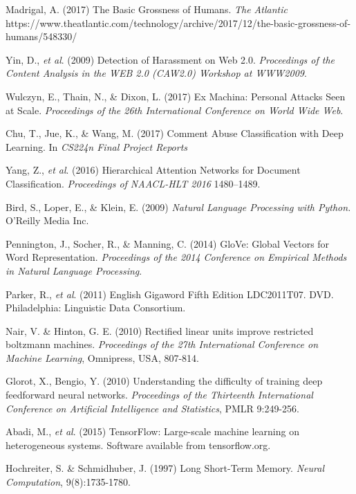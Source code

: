 \documentclass{article} %
\begin{document}
\footnotesize{
\begin{thebibliography}{9}

 Madrigal, A. (2017) The Basic Grossness of Humans. \textit{The Atlantic} https://www.theatlantic.com/technology/archive/2017/12/the-basic-grossness-of-humans/548330/

Yin, D., \textit{et al}. (2009) Detection of Harassment on Web 2.0. \textit{Proceedings of the Content Analysis in the WEB 2.0 (CAW2.0) Workshop at WWW2009}.

Wulczyn, E., Thain, N., \& Dixon, L. (2017) Ex Machina: Personal Attacks Seen at Scale. \textit{Proceedings of the 26th International Conference on World Wide Web}.

Chu, T., Jue, K., \& Wang, M. (2017) Comment Abuse Classification with Deep Learning. In \textit{CS224n Final Project Reports}

Yang, Z., \textit{et al}. (2016) Hierarchical Attention Networks for Document Classification. \textit{Proceedings of NAACL-HLT 2016} 1480–1489.

Bird, S., Loper, E., \& Klein, E. (2009) \textit{Natural Language Processing with Python.} O’Reilly Media Inc. 

Pennington, J., Socher, R., \& Manning, C. (2014) GloVe: Global Vectors for Word Representation. \textit{Proceedings of the 2014 Conference on Empirical Methods in Natural Language Processing}.

 Parker, R.,  \textit{et al}. (2011) English Gigaword Fifth Edition LDC2011T07. DVD. Philadelphia: Linguistic Data Consortium.

 Nair, V. \& Hinton, G. E. (2010) Rectified linear units improve restricted boltzmann machines. \textit{Proceedings of the 27th International Conference on Machine Learning}, Omnipress, USA, 807-814.

 Glorot, X., Bengio, Y. (2010) Understanding the difficulty of training deep feedforward neural networks. \textit{Proceedings of the Thirteenth International Conference on Artificial Intelligence and Statistics}, PMLR 9:249-256.

 Abadi, M., \textit{et al}. (2015) TensorFlow: Large-scale machine learning on heterogeneous systems. Software available from tensorflow.org.

 Hochreiter, S. \& Schmidhuber, J. (1997) Long Short-Term Memory. \textit{Neural Computation}, 9(8):1735-1780.


\end{thebibliography}}
\end{document}
